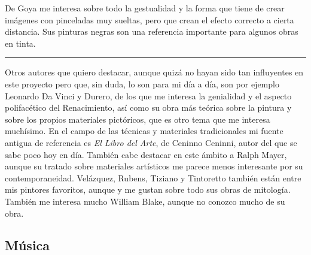 \documentclass[twoside]{article}
\begin{document}
\begin{multicols}{2}
    De Goya me interesa sobre todo la gestualidad y la forma que tiene de
    crear imágenes con pinceladas muy sueltas, pero que crean el efecto
    correcto a cierta distancia. Sus pinturas negras son una referencia
    importante para algunos obras en tinta.
    
    \begin{center}\rule{0.5\linewidth}{0.5pt}\end{center}
    
    Otros autores que quiero destacar, aunque quizá no hayan sido tan
    influyentes en este proyecto pero que, sin duda, lo son para mi día a
    día, son por ejemplo Leonardo Da Vinci y Durero, de los que me interesa
    la genialidad y el aspecto polifacético del Renacimiento, así como su
    obra más teórica sobre la pintura y sobre los propios materiales
    pictóricos, que es otro tema que me interesa muchísimo. En el campo de
    las técnicas y materiales tradicionales mi fuente antigua de referencia
    es \emph{El Libro del Arte}\autocite{cennini1956}, de Ceninno Ceninni, autor del que se sabe
    poco hoy en día. También cabe destacar en este ámbito a Ralph Mayer,
    aunque su tratado sobre materiales artísticos\autocite*{mayer1948} me parece menos
    interesante por su contemporaneidad. Velázquez, Rubens, Tiziano y
    Tintoretto también están entre mis pintores favoritos, aunque y me
    gustan sobre todo sus obras de mitología. También me interesa mucho
    William Blake, aunque no conozco mucho de su obra.
    
    \hypertarget{muxfasica}{%
    \subsection{Música}\label{muxfasica}}
    

\end{multicols}
\end{document}
